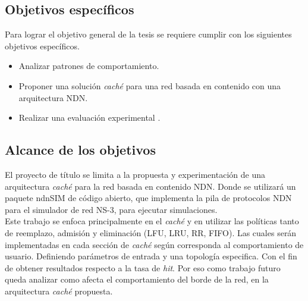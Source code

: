 \documentclass[12pt]{ociamthesis}  %
\begin{document}
\subsection{Objetivos específicos}
Para lograr el objetivo general de la tesis se requiere cumplir con los siguientes objetivos específicos.
\begin{itemize}
	\item Analizar patrones de comportamiento.
	\item Proponer una solución \textit{caché} para una red basada en contenido con una arquitectura NDN.
	\item Realizar una evaluación experimental .
\end{itemize}


\subsection{Alcance de los objetivos}

El proyecto de título se limita a la propuesta y experimentación de una arquitectura \textit{caché} para la red basada en contenido NDN. Donde se utilizará un  paquete ndnSIM de código abierto, que implementa la pila de protocolos NDN para el simulador de red NS-3, para ejecutar simulaciones.\\

Este trabajo se enfoca principalmente en el \textit{caché} y en  utilizar las políticas tanto de reemplazo, admisión y eliminación (LFU, LRU, RR, FIFO). Las cuales serán implementadas en cada sección de \textit{caché} según corresponda al comportamiento de usuario. Definiendo parámetros de entrada y una topología especifica. Con el fin de obtener resultados respecto a la tasa de \textit{hit}. Por eso como trabajo futuro queda analizar como afecta el comportamiento del borde de la red, en la arquitectura \textit{caché} propuesta.
\end{document}
